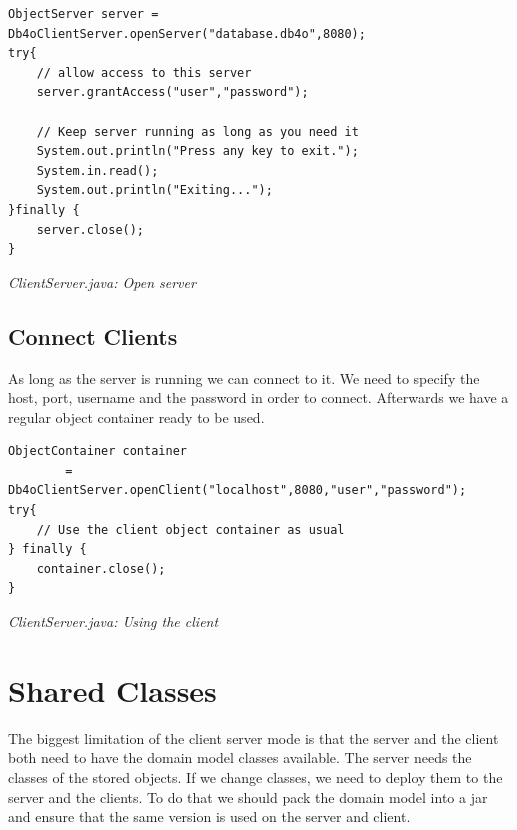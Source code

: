 \begin{lstlisting}
ObjectServer server = Db4oClientServer.openServer("database.db4o",8080);
try{
    // allow access to this server
    server.grantAccess("user","password");

    // Keep server running as long as you need it
    System.out.println("Press any key to exit.");
    System.in.read();
    System.out.println("Exiting...");
}finally {
    server.close();
}
\end{lstlisting}

{\small\itshape ClientServer.java: Open server\par}
\medskip

\subsection*{Connect Clients}

As long as the server is running we can connect to it. We need to specify the host, port, username and the password in order to connect. Afterwards we have a regular object container ready to be used.

\begin{lstlisting}
ObjectContainer container
        = Db4oClientServer.openClient("localhost",8080,"user","password");
try{
    // Use the client object container as usual
} finally {
    container.close();
}
\end{lstlisting}

{\small\itshape ClientServer.java: Using the client\par}
\medskip

\section{Shared Classes}
\label{tut:client-server:sharedclasses}

The biggest limitation of the client server mode is that the server and the client both need to have the domain model classes available. The server needs the classes of the stored objects. If we change classes, we need to deploy them to the server and the clients. To do that we should pack the domain model into a jar and ensure that the same version is used on the server and client.

